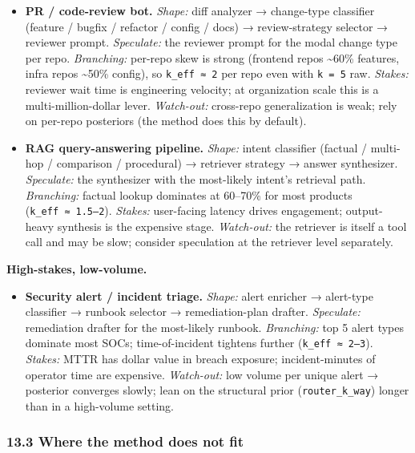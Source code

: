 \documentclass[
  11pt,
]{article}
\providecommand{\tightlist}{%
  \setlength{\itemsep}{0pt}\setlength{\parskip}{0pt}}
\begin{document}
\begin{itemize}
\item
  \textbf{PR / code-review bot.} \emph{Shape:} diff analyzer →
  change-type classifier (feature / bugfix / refactor / config / docs) →
  review-strategy selector → reviewer prompt. \emph{Speculate:} the
  reviewer prompt for the modal change type per repo. \emph{Branching:}
  per-repo skew is strong (frontend repos \textasciitilde60\% features,
  infra repos \textasciitilde50\% config), so \texttt{k\_eff\ ≈\ 2} per
  repo even with \texttt{k\ =\ 5} raw. \emph{Stakes:} reviewer wait time
  is engineering velocity; at organization scale this is a
  multi-million-dollar lever. \emph{Watch-out:} cross-repo
  generalization is weak; rely on per-repo posteriors (the method does
  this by default).
\item
  \textbf{RAG query-answering pipeline.} \emph{Shape:} intent classifier
  (factual / multi-hop / comparison / procedural) → retriever strategy →
  answer synthesizer. \emph{Speculate:} the synthesizer with the
  most-likely intent's retrieval path. \emph{Branching:} factual lookup
  dominates at 60--70\% for most products (\texttt{k\_eff\ ≈\ 1.5–2}).
  \emph{Stakes:} user-facing latency drives engagement; output-heavy
  synthesis is the expensive stage. \emph{Watch-out:} the retriever is
  itself a tool call and may be slow; consider speculation at the
  retriever level separately.
\end{itemize}

\textbf{High-stakes, low-volume.}

\begin{itemize}
\tightlist
\item
  \textbf{Security alert / incident triage.} \emph{Shape:} alert
  enricher → alert-type classifier → runbook selector → remediation-plan
  drafter. \emph{Speculate:} remediation drafter for the most-likely
  runbook. \emph{Branching:} top 5 alert types dominate most SOCs;
  time-of-incident tightens further (\texttt{k\_eff\ ≈\ 2–3}).
  \emph{Stakes:} MTTR has dollar value in breach exposure;
  incident-minutes of operator time are expensive. \emph{Watch-out:} low
  volume per unique alert → posterior converges slowly; lean on the
  structural prior (\texttt{router\_k\_way}) longer than in a
  high-volume setting.
\end{itemize}

\subsubsection{13.3 Where the method does not
fit}\label{where-the-method-does-not-fit}
\end{document}
